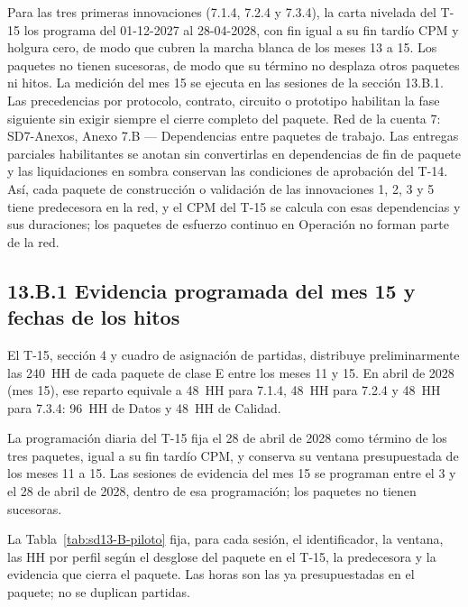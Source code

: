 Para las tres primeras innovaciones (7.1.4, 7.2.4 y 7.3.4), la carta nivelada del T-15 los programa del 01-12-2027 al 28-04-2028, con fin igual a su fin tardío CPM y holgura cero, de modo que cubren la marcha blanca de los meses 13 a 15. Los paquetes no tienen sucesoras, de modo que su término no desplaza otros paquetes ni hitos. La medición del mes 15 se ejecuta en las sesiones de la sección 13.B.1. Las precedencias por protocolo, contrato, circuito o prototipo habilitan la fase siguiente sin exigir siempre el cierre completo del paquete. Red de la cuenta 7: SD7-Anexos, Anexo 7.B — Dependencias entre paquetes de trabajo. Las entregas parciales habilitantes se anotan sin convertirlas en dependencias de fin de paquete y las liquidaciones en sombra conservan las condiciones de aprobación del T-14. Así, cada paquete de construcción o validación de las innovaciones 1, 2, 3 y 5 tiene predecesora en la red, y el CPM del T-15 se calcula con esas dependencias y sus duraciones; los paquetes de esfuerzo continuo en Operación no forman parte de la red.

\subsection*{13.B.1 Evidencia programada del mes 15 y fechas de los hitos}

El T-15, sección 4 y cuadro de asignación de partidas, distribuye preliminarmente las 240~HH de cada paquete de clase E entre los meses 11 y 15. En abril de 2028 (mes 15), ese reparto equivale a 48~HH para 7.1.4, 48~HH para 7.2.4 y 48~HH para 7.3.4: 96~HH de Datos y 48~HH de Calidad.

La programación diaria del T-15 fija el 28 de abril de 2028 como término de los tres paquetes, igual a su fin tardío CPM, y conserva su ventana presupuestada de los meses 11 a 15. Las sesiones de evidencia del mes 15 se programan entre el 3 y el 28 de abril de 2028, dentro de esa programación; los paquetes no tienen sucesoras.

La Tabla~\ref{tab:sd13-B-piloto} fija, para cada sesión, el identificador, la ventana, las HH por perfil según el desglose del paquete en el T-15, la predecesora y la evidencia que cierra el paquete. Las horas son las ya presupuestadas en el paquete; no se duplican partidas.

